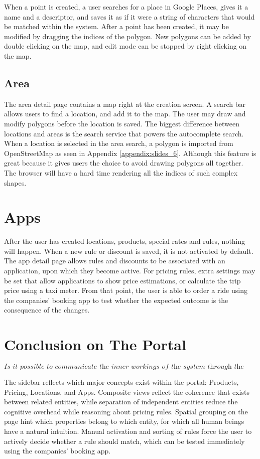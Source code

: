 When a point is created, a user searches for a place in Google Places, gives it a name and a descriptor, and saves it as if it were a string of characters that would be matched within the system. After a point has been created, it may be modified by dragging the indices of the polygon. New polygons can be added by double clicking on the map, and edit mode can be stopped by right clicking on the map.

\subsection{Area}
The area detail page contains a map right at the creation screen. A search bar allows users to find a location, and add it to the map. The user may draw and modify polygons before the location is saved. The biggest difference between locations and areas is the search service that powers the autocomplete search. When a location is selected in the area search, a polygon is imported from OpenStreetMap as seen in Appendix \ref{appendix:slides_6}. Although this feature is great because it gives users the choice to avoid drawing polygons all together. The browser will have a hard time rendering all the indices of such complex shapes.

\section{Apps}
After the user has created locations, products, special rates and rules, nothing will happen. When a new rule or discount is saved, it is not activated by default. The app detail page allows rules and discounts to be associated with an application, upon which they become active. For pricing rules, extra settings may be set that allow applications to show price estimations, or calculate the trip price using a taxi meter. From that point, the user is able to order a ride using the companies' booking app to test whether the expected outcome is the consequence of the changes.

\section{Conclusion on The Portal}
\[\textit{Is it possible to communicate the inner workings of the system through the user interface?}\]\hfill

The sidebar reflects which major concepts exist within the portal: Products, Pricing, Locations, and Apps. Composite views reflect the coherence that exists between related entities, while separation of independent entities reduce the cognitive overhead while reasoning about pricing rules. Spatial grouping on the page hint which properties belong to which entity, for which all human beings have a natural intuition. Manual activation and sorting of rules force the user to actively decide whether a rule should match, which can be tested immediately using the companies' booking app.
